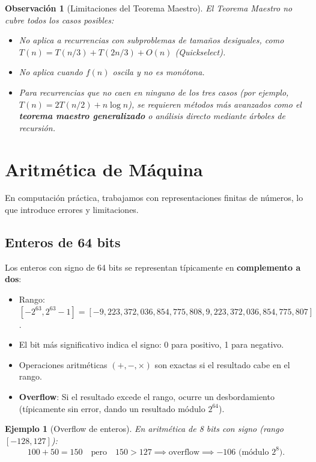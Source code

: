\documentclass[a4paper,11pt]{report}
\newtheorem{example}[theorem]{Ejemplo}
\newtheorem{remark}[theorem]{Observación}
\begin{document}
\begin{remark}[Limitaciones del Teorema Maestro]
El Teorema Maestro no cubre todos los casos posibles:
\begin{itemize}
\item No aplica a recurrencias con subproblemas de tamaños desiguales, como $T(n) = T(n/3) + T(2n/3) + O(n)$ (Quickselect).
\item No aplica cuando $f(n)$ oscila y no es monótona.
\item Para recurrencias que no caen en ninguno de los tres casos (por ejemplo, $T(n) = 2T(n/2) + n \log n$), se requieren métodos más avanzados como el \textbf{teorema maestro generalizado} o análisis directo mediante árboles de recursión.
\end{itemize}
\end{remark}

\section{Aritmética de Máquina}

En computación práctica, trabajamos con representaciones finitas de números, lo que introduce errores y limitaciones.

\subsection{Enteros de 64 bits}

Los enteros con signo de 64 bits se representan típicamente en \textbf{complemento a dos}:

\begin{itemize}
\item Rango: $[-2^{63}, 2^{63}-1] = [-9{,}223{,}372{,}036{,}854{,}775{,}808, 9{,}223{,}372{,}036{,}854{,}775{,}807]$.
\item El bit más significativo indica el signo: 0 para positivo, 1 para negativo.
\item Operaciones aritméticas $(+, -, \times)$ son exactas si el resultado cabe en el rango.
\item \textbf{Overflow}: Si el resultado excede el rango, ocurre un desbordamiento (típicamente sin error, dando un resultado módulo $2^{64}$).
\end{itemize}

\begin{example}[Overflow de enteros]
En aritmética de 8 bits con signo (rango $[-128, 127]$):
\[
100 + 50 = 150 \quad \text{pero} \quad 150 > 127 \implies \text{overflow} \implies -106 \text{ (módulo } 2^8).
\]
\end{example}
\end{document}
